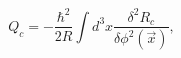 \begin{equation}
Q_{c}=-\frac{\hbar^{2}}{2R}\int d^{3}x\frac{\delta^{2}R_{c}}{\delta\phi
^{2}\left(  \vec{x}\right)  },\label{23}%
\end{equation}

